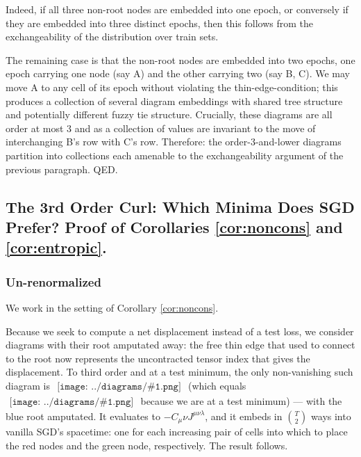 \documentclass{article}
\theoremstyle{plain}
\theoremstyle{definition}
\newcommand{\sdia}[1]{\begin{gathered}\texttt{[image: ../diagrams/\#1.png]}\end{gathered}}
\begin{document}
        Indeed, if all three non-root nodes are embedded into one epoch, or
        conversely if they are embedded into three distinct epochs, then
        this follows from the exchangeability of the distribution over train
        sets.

        The remaining case is that the non-root nodes are embedded into two
        epochs, one epoch carrying one node (say A) and the other carrying two
        (say B, C).  We may move A to any cell of its epoch without violating
        the thin-edge-condition; this produces a collection of several
        diagram embeddings with shared tree structure and potentially
        different fuzzy tie structure.  Crucially, these diagrams are all order
        at most $3$ and as a collection of values are invariant to the move
        of interchanging B's row with C's row.  Therefore:
        the order-$3$-and-lower diagrams partition into collections each 
        amenable to the exchangeability argument of the previous paragraph.
        QED.

    \subsection{
        The 3rd Order Curl: Which Minima Does SGD Prefer?
        Proof of Corollaries \ref{cor:noncons} and \ref{cor:entropic}. 
    }
        \subsubsection*{Un-renormalized}
            We work in the setting of Corollary \ref{cor:noncons}.

            Because we seek to compute a net displacement instead of a test
            loss, we consider diagrams with their root amputated away: the free
            thin edge that used to connect to the root now represents the
            uncontracted tensor index that gives the displacement.  To third
            order and at a test minimum, the only non-vanishing such diagram is
            $\sdia{(01-2-3)(02-12-23)}$ (which equals
            $\sdia{c(01-2-3)(02-12-23)}$ because we are at a test minimum) ---
            with the {\color{moob}blue} root amputated.
            It evaluates to $-C_\mu\nu J^{\mu\nu\lambda}$, and it embeds in
            ${T\choose 2}$ ways into vanilla SGD's spacetime: one for each
            increasing pair of cells into which to place the 
            {\color{moor}red} nodes and the
            {\color{moog}green} node, respectively.  The result follows.
\end{document}
